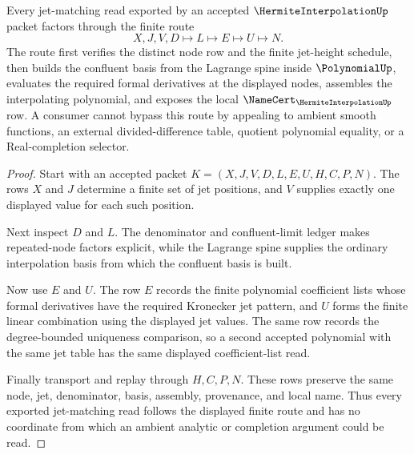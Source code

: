 \begin{theorem}
\label{thm:hermite-interpolation-jet-matching}
Every jet-matching read exported by an accepted $\HermiteInterpolationUp$ packet factors through the finite route
$$
X,J,V,D \longmapsto L \longmapsto E \longmapsto U \longmapsto N .
$$
The route first verifies the distinct node row and the finite jet-height schedule, then builds the confluent basis from the Lagrange spine inside $\PolynomialUp$, evaluates the required formal derivatives at the displayed nodes, assembles the interpolating polynomial, and exposes the local $\NameCert_{\HermiteInterpolationUp}$ row. A consumer cannot bypass this route by appealing to ambient smooth functions, an external divided-difference table, quotient polynomial equality, or a Real-completion selector.
\end{theorem}
\begin{proof}
Start with an accepted packet $K=(X,J,V,D,L,E,U,H,C,P,N)$. The rows $X$ and $J$ determine a finite set of jet positions, and $V$ supplies exactly one displayed value for each such position.

Next inspect $D$ and $L$. The denominator and confluent-limit ledger makes repeated-node factors explicit, while the Lagrange spine supplies the ordinary interpolation basis from which the confluent basis is built.

Now use $E$ and $U$. The row $E$ records the finite polynomial coefficient lists whose formal derivatives have the required Kronecker jet pattern, and $U$ forms the finite linear combination using the displayed jet values. The same row records the degree-bounded uniqueness comparison, so a second accepted polynomial with the same jet table has the same displayed coefficient-list read.

Finally transport and replay through $H,C,P,N$. These rows preserve the same node, jet, denominator, basis, assembly, provenance, and local name. Thus every exported jet-matching read follows the displayed finite route and has no coordinate from which an ambient analytic or completion argument could be read.
\end{proof}


